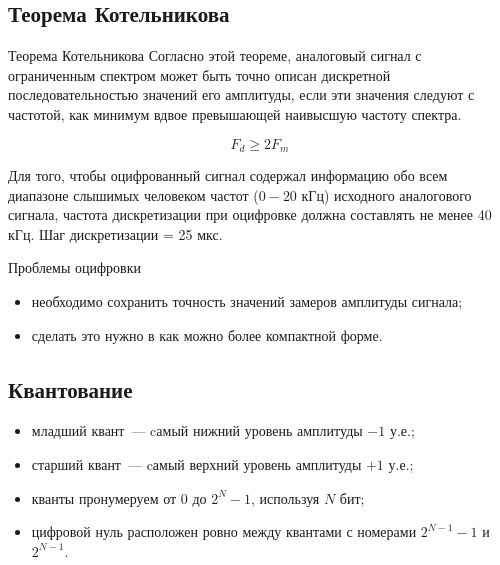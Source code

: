 \documentclass{beamer}
\begin{document}
\subsection{Теорема Котельникова}
\begin{frame}
\begin{block}{Теорема Котельникова}
Согласно этой теореме, аналоговый сигнал с ограниченным спектром может быть точно описан дискретной последовательностью значений его амплитуды, если эти значения следуют с частотой, как минимум вдвое превышающей наивысшую частоту спектра.
\end{block}

\[F_d\geq2F_m\] 

Для того, чтобы оцифрованный сигнал содержал информацию обо всем диапазоне слышимых человеком частот ($0 - 20$ кГц) исходного аналогового сигнала, частота дискретизации при оцифровке должна составлять не менее 40 кГц. Шаг дискретизации = 25 мкс. 

\begin{block}{Проблемы оцифровки}
\begin{itemize}
\item необходимо сохранить точность значений замеров амплитуды сигнала;
\item сделать это нужно в как можно более компактной форме.
\end{itemize} 
\end{block}
\end{frame}

\subsection{Квантование}
\begin{frame}
\begin{itemize}
\item младший квант~--- cамый нижний уровень амплитуды $-1$ у.е.;
\item старший квант~--- cамый верхний уровень амплитуды $+1$ у.е.;
\item кванты пронумеруем от $0$ до $2^N-1$, используя $N$ бит;
\item цифровой нуль расположен ровно между квантами с номерами $2^{N-1}-1$ и $2^{N-1}$.
\end{itemize}
\end{frame}
\end{document}
